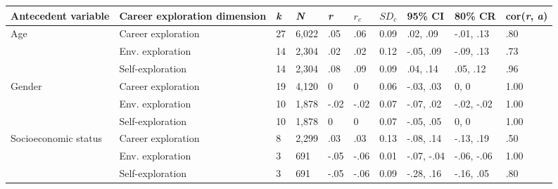 \begin{table}[ht]
\centering
\begin{tabular}{llllllllll}
  \hline
Antecedent variable & Career exploration dimension & \textit{k} & \textit{N} & \textit{r} & \textit{$r_c$} & \textit{$SD_c$} & 95\% CI & 80\% CR & cor(\textit{r}, \textit{a})  \\ 
  \hline
Age & Career exploration & 27 & 6,022 & .05 & .06 & 0.09 & .02, .09 & -.01, .13 & .80 \\ 
   & \hspace{0.8em}Env. exploration & 14 & 2,304 & .02 & .02 & 0.12 & -.05, .09 & -.09, .13 & .73 \\ 
   & \hspace{0.8em}Self-exploration & 14 & 2,304 & .08 & .09 & 0.09 & .04, .14 & .05, .12 & .96 \\ 
  Gender & Career exploration & 19 & 4,120 & 0 & 0 & 0.06 & -.03, .03 & 0, 0 & 1.00 \\ 
   & \hspace{0.8em}Env. exploration & 10 & 1,878 & -.02 & -.02 & 0.07 & -.07, .02 & -.02, -.02 & 1.00 \\ 
   & \hspace{0.8em}Self-exploration & 10 & 1,878 & 0 & 0 & 0.07 & -.05, .05 & 0, 0 & 1.00 \\ 
  Socioeconomic status & Career exploration & 8 & 2,299 & .03 & .03 & 0.13 & -.08, .14 & -.13, .19 & .50 \\ 
   & \hspace{0.8em}Env. exploration & 3 & 691 & -.05 & -.06 & 0.01 & -.07, -.04 & -.06, -.06 & 1.00 \\ 
   & \hspace{0.8em}Self-exploration & 3 & 691 & -.05 & -.06 & 0.09 & -.28, .16 & -.16, .05 & .80 \\ 
   \hline
\end{tabular}
\end{table}
